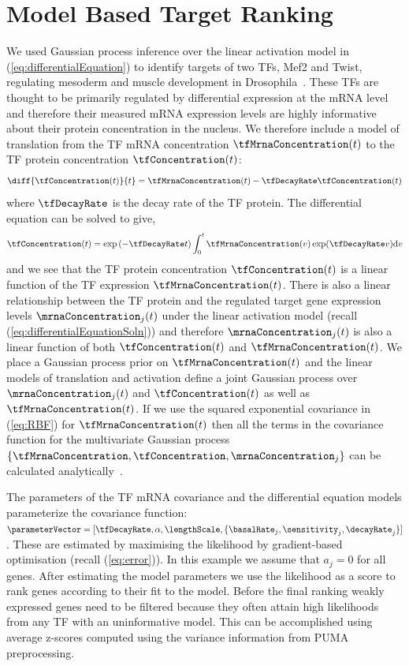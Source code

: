 \documentclass{article}
\begin{document}
\section{Model Based Target Ranking}
\label{sec:targetRanking}

We used Gaussian process inference over the linear activation
model in (\ref{eq:differentialEquation}) to identify targets of two
TFs, Mef2 and Twist, regulating mesoderm and muscle development
in Drosophila~\citep{Honkela:modelbased10}. These TFs are thought to
be primarily regulated by differential
expression at the mRNA level and therefore their measured mRNA
expression levels are highly informative about their protein
concentration in the nucleus. We therefore include a model of
translation from the TF mRNA concentration $\tfMrnaConcentration(t)$ to the TF protein
concentration $\tfConcentration(t)$:
\begin{equation}
\diff{\tfConcentration(t)}{t} = \tfMrnaConcentration(t) - \tfDecayRate
\tfConcentration(t)
\end{equation}
where $\tfDecayRate$ is the decay rate of the TF protein. The
differential equation can be solved to give,
\[
\tfConcentration(t) = \exp\left(-\tfDecayRate t\right) \int_0^t
    \tfMrnaConcentration(v) \exp(\tfDecayRate v)  \mathrm{d}v
\]
and we see that the TF protein concentration  $\tfConcentration(t)$ is a linear function of the
TF expression $\tfMrnaConcentration(t)$. There is also a linear relationship
between the TF protein and the regulated target gene expression levels
$\mrnaConcentration_j(t)$ under the linear
activation model (recall
(\ref{eq:differentialEquationSoln})) and therefore $\mrnaConcentration_j(t)$
is also a linear function of both $\tfConcentration(t)$ and $\tfMrnaConcentration(t)$. We place a
Gaussian process prior on $\tfMrnaConcentration(t)$ and the linear models of
translation and activation define a joint Gaussian process over
$\mrnaConcentration_j(t)$ and $\tfConcentration(t)$ as well as
$\tfMrnaConcentration(t)$. If we use the squared
exponential covariance in (\ref{eq:RBF}) for $\tfMrnaConcentration(t)$
then all the terms in the covariance function for the multivariate Gaussian process 
$\{\tfMrnaConcentration,\tfConcentration,\mrnaConcentration_j\}$ can
be calculated analytically~\citep{Honkela:modelbased10}.  

The parameters of the TF mRNA
covariance and the differential equation models parameterize the covariance function: $\parameterVector =
[\tfDecayRate,\alpha,\lengthScale,\{\basalRate_j, \sensitivity_j,
  \decayRate_j\}]$. These are estimated by maximising the likelihood by
gradient-based optimisation (recall (\ref{eq:error})).  In this
example we assume that $a_j = 0$ for all genes. After
estimating the model parameters we use the likelihood as a score to
rank genes according to their fit to the model. Before the final
ranking weakly expressed genes need to be filtered because they often
attain high likelihoods from any TF with an uninformative model.
This can be accomplished using average z-scores computed using the
variance information from PUMA preprocessing.
\end{document}
